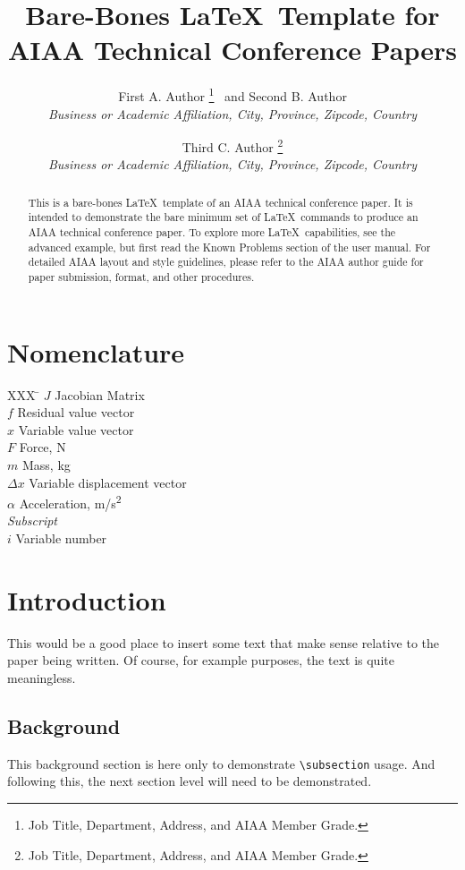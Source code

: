 \documentclass[]{aiaa-tc}%
\title{Bare-Bones \LaTeX\ Template for
        AIAA Technical Conference Papers}
\author{
  First A. Author%
    \thanks{Job Title, Department, Address, and AIAA Member Grade.}
  \ and Second B. Author\thanksibid{2}\\
  {\normalsize\itshape
   Business or Academic Affiliation, City, Province, Zipcode, Country}\\
  \and
  Third C. Author%
   \thanks{Job Title, Department, Address, and AIAA Member Grade.}\\
  {\normalsize\itshape
  Business or Academic Affiliation, City, Province, Zipcode, Country}
 }
\begin{document}
\maketitle

\begin{abstract}
This is a bare-bones \LaTeX\ template of an AIAA technical conference paper.
It is intended to demonstrate the bare minimum set of \LaTeX\ commands
to produce an AIAA technical conference paper.
To explore more \LaTeX\ capabilities, see the advanced example, but
first read the Known Problems section of the user manual.
For detailed AIAA layout and style guidelines, please refer to the AIAA
author guide for paper submission, format, and other procedures.
\end{abstract}

\section*{Nomenclature}

\begin{tabbing}
  XXX \= \kill%
  $J$ \> Jacobian Matrix \\
  $f$ \> Residual value vector \\
  $x$ \> Variable value vector \\
  $F$ \> Force, N \\
  $m$ \> Mass, kg \\
  $\Delta x$ \> Variable displacement vector \\
  $\alpha$ \> Acceleration, m/s\textsuperscript{2} \\[5pt]
  \textit{Subscript}\\
  $i$ \> Variable number \\
 \end{tabbing}

\section{Introduction}

This would be a good place to insert some text that make sense relative
to the paper being written.
Of course, for example purposes, the text is quite meaningless.

\subsection{Background}

This background section is here only to demonstrate \verb|\subsection|
usage.
And following this, the next section level will need to be demonstrated.
\end{document}
